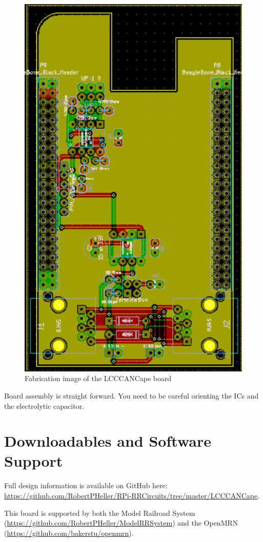 \begin{figure}[hbpt]\begin{centering}%
\includegraphics[width=5in]{LCCCANCape.png}
\caption{Fabrication image of the LCCCANCape board}
\end{centering}\end{figure}
Board assembly is straight forward. You need to be careful orienting the ICs
and the electrolytic capacitor.


\section{Downloadables and Software Support}

Full design information is available on GitHub here:
\url{https://github.com/RobertPHeller/RPi-RRCircuits/tree/master/LCCCANCape}.

This board is supported by both the Model Railroad System 
(\url{https://github.com/RobertPHeller/ModelRRSystem}) and the OpenMRN 
(\url{https://github.com/bakerstu/openmrn}).
